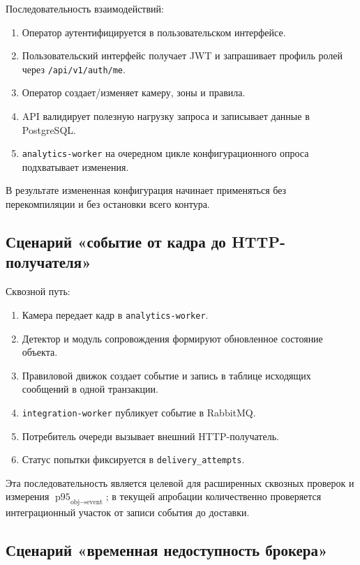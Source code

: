 Последовательность взаимодействий:
\begin{enumerate}
    \item Оператор аутентифицируется в пользовательском интерфейсе.
    \item Пользовательский интерфейс получает JWT и запрашивает профиль ролей через \texttt{/api/v1/auth/me}.
    \item Оператор создает/изменяет камеру, зоны и правила.
    \item API валидирует полезную нагрузку запроса и записывает данные в PostgreSQL.
    \item \texttt{analytics-worker} на очередном цикле конфигурационного опроса подхватывает изменения.
\end{enumerate}

В результате измененная конфигурация начинает применяться без перекомпиляции и без остановки всего контура.

\subsection{Сценарий «событие от кадра до HTTP-получателя»}

Сквозной путь:
\begin{enumerate}
    \item Камера передает кадр в \texttt{analytics-worker}.
    \item Детектор и модуль сопровождения формируют обновленное состояние объекта.
    \item Правиловой движок создает событие и запись в таблице исходящих сообщений в одной транзакции.
    \item \texttt{integration-worker} публикует событие в RabbitMQ.
    \item Потребитель очереди вызывает внешний HTTP-получатель.
    \item Статус попытки фиксируется в \texttt{delivery\_attempts}.
\end{enumerate}

Эта последовательность является целевой для расширенных сквозных проверок и измерения \(\operatorname{p95}_{\text{obj}\to\text{event}}\); в текущей апробации количественно проверяется интеграционный участок от записи события до доставки.

\subsection{Сценарий «временная недоступность брокера»}

